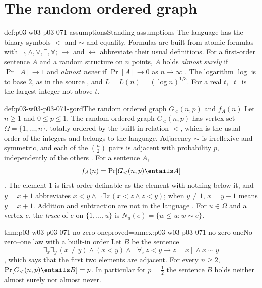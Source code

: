 \section{The random ordered graph}
\label{sec:p03-w03-p03-071-ordered}

\begin{hbconvention}{def:p03-w03-p03-071-assumptions}{Standing assumptions}
The language has the binary symbols \(<\) and \(\sim\) and equality.
Formulas are built from atomic formulas with \(\neg,\wedge,\vee,\exists,
\forall\); \(\to\) and \(\leftrightarrow\) abbreviate their usual
definitions.  For a first-order sentence \(A\) and a random structure on
\(n\) points, \(A\) holds \emph{almost surely} if \(\Pr[A]\to1\) and
\emph{almost never} if \(\Pr[A]\to0\) as \(n\to\infty\)
\cite[p.~2]{Spencer2007LogicRandomStructuresAuthor}.  The logarithm
\(\log\) is to base \(2\), as in the source
\cite[p.~23]{Spencer2007LogicRandomStructuresAuthor}, and
\(L=L(n)=(\log n)^{1/3}\).  For a real \(t\), \(\lfloor t\rfloor\) is the
largest integer not above \(t\).
\end{hbconvention}

\begin{hbdefinition}{def:p03-w03-p03-071-gord}{The random ordered graph \(G_<(n,p)\) and \(f_A(n)\)}
Let \(n\geq1\) and \(0\leq p\leq1\).  The random ordered graph \(G_<(n,p)\)
has vertex set \(\Omega=\{1,\ldots,n\}\), totally ordered by the built-in
relation \(<\), which is the usual order of the integers and belongs to the
language.  Adjacency \(\sim\) is irreflexive and symmetric, and each of the
\(\binom n2\) pairs is adjacent with probability \(p\), independently of the
others \cite[p.~22]{Spencer2007LogicRandomStructuresAuthor}.  For a sentence
\(A\),
\[
  f_A(n)=\Pr[G_<(n,p)\entails A]
\]
\cite[p.~25]{Spencer2007LogicRandomStructuresAuthor}.  The element \(1\) is
first-order definable as the element with nothing below it, and
\(y=x+1\) abbreviates \(x<y\wedge\neg\exists z\,(x<z\wedge z<y)\); when
\(y\neq1\), \(x=y-1\) means \(y=x+1\).  Addition and subtraction are not in
the language \cite[p.~22]{Spencer2007LogicRandomStructuresAuthor}.  For
\(u\in\Omega\) and a vertex \(e\), the \emph{trace} of \(e\) on
\(\{1,\ldots,u\}\) is \(N_u(e)=\{w\leq u: w\sim e\}\).
\end{hbdefinition}

\begin{hbtheorem}{thm:p03-w03-p03-071-no-zero-one}{proved=annex:p03-w03-p03-071-no-zero-one}{No zero--one law with a built-in order}
Let \(B\) be the sentence
\[
  \exists_x\exists_y\,(x\neq y)\wedge(x<y)\wedge[\forall_z\,z<y\to z=x]
  \wedge x\sim y
\]
\cite[p.~22]{Spencer2007LogicRandomStructuresAuthor}, which says that the
first two elements are adjacent.  For every \(n\geq2\),
\(\Pr[G_<(n,p)\entails B]=p\).  In particular for \(p=\frac12\) the
sentence \(B\) holds neither almost surely nor almost never.
\end{hbtheorem}

